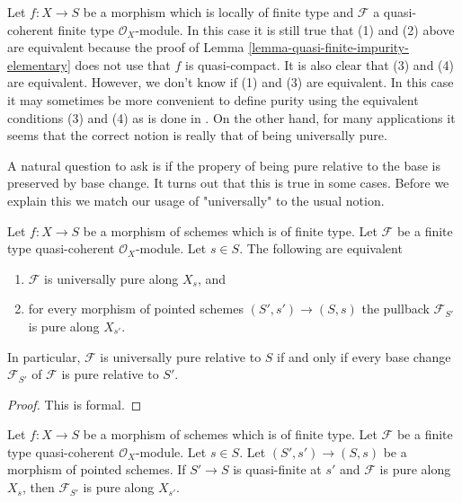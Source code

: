 \begin{remark}
\label{remark-discuss-finite-type}
Let $f : X \to S$ be a morphism which is locally of finite type
and $\mathcal{F}$ a quasi-coherent finite type $\mathcal{O}_X$-module.
In this case it is still true that (1) and (2) above are equivalent
because the proof of
Lemma \ref{lemma-quasi-finite-impurity-elementary}
does not use that $f$ is quasi-compact. It is also clear that
(3) and (4) are equivalent. However, we don't know if (1) and (3) are
equivalent. In this case it may sometimes be more convenient to define
purity using the equivalent conditions (3) and (4) as is done in \cite{GruRay}.
On the other hand, for many applications it seems that the correct notion
is really that of being universally pure.
\end{remark}

\noindent
A natural question to ask is if the propery of being pure relative to
the base is preserved by base change. It turns out that this is true
in some cases. Before we explain this we match our usage of "universally"
to the usual notion.

\begin{lemma}
\label{lemma-base-change-universally}
Let $f : X \to S$ be a morphism of schemes which is of finite type.
Let $\mathcal{F}$ be a finite type quasi-coherent $\mathcal{O}_X$-module.
Let $s \in S$. The following are equivalent
\begin{enumerate}
\item $\mathcal{F}$ is universally pure along $X_s$, and
\item for every morphism of pointed schemes $(S', s') \to (S, s)$
the pullback $\mathcal{F}_{S'}$ is pure along $X_{s'}$.
\end{enumerate}
In particular, $\mathcal{F}$ is universally pure relative to $S$ if and
only if every base change $\mathcal{F}_{S'}$ of $\mathcal{F}$ is
pure relative to $S'$.
\end{lemma}

\begin{proof}
This is formal.
\end{proof}

\begin{lemma}
\label{lemma-quasi-finite-base-change}
Let $f : X \to S$ be a morphism of schemes which is of finite type.
Let $\mathcal{F}$ be a finite type quasi-coherent $\mathcal{O}_X$-module.
Let $s \in S$. Let $(S', s') \to (S, s)$ be a morphism of pointed schemes.
If $S' \to S$ is quasi-finite at $s'$ and $\mathcal{F}$ is pure along $X_s$,
then $\mathcal{F}_{S'}$ is pure along $X_{s'}$.
\end{lemma}

